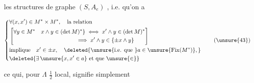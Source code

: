 
  les structures de graphe $(S,A_e)$ , i.e. qu'on a

\[
\left\{\begin{aligned}
&\forall(x,x')\in M^*\times M^*,\quad\text{la relation}\\
&\left[\begin{aligned}
&\forall y\in M^*\quad x\wedge y\in(\det M)^*\} \iff x'\wedge y\in(\det M)^*\\
&\hspace{38mm}\implies x'\wedge y\in\{\pm x\wedge y\}
\end{aligned}\right]\\
&\text{implique}\quad x'\in\pm x,\quad\deleted{\text{\unsure{i.e. que }} a\in\unsure{\mathrm{Fix}(M^*)},}\\
&\deleted{\exists\,\unsure{x,x'\in a}\ \text{et que }\unsure{\in}}
\end{aligned}\right. \tag*{(\unsure{43})}
\]

ce qui, pour $\Lambda$ $\frac12$ local, signifie simplement 

